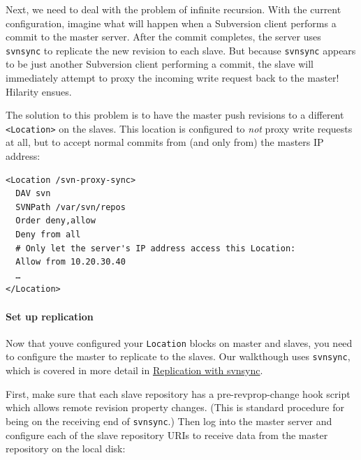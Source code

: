 Next, we need to deal with the problem of infinite recursion. With the
current configuration, imagine what will happen when a Subversion client
performs a commit to the master server. After the commit completes, the
server uses \texttt{svnsync} to replicate the new revision to each
slave. But because \texttt{svnsync} appears to be just another
Subversion client performing a commit, the slave will immediately
attempt to proxy the incoming write request back to the master! Hilarity
ensues.

The solution to this problem is to have the master push revisions to a
different \texttt{\textless{}Location\textgreater{}} on the slaves. This
location is configured to \emph{not} proxy write requests at all, but to
accept normal commits from (and only from) the master\textquotesingle s
IP address:

\begin{verbatim}
<Location /svn-proxy-sync>
  DAV svn
  SVNPath /var/svn/repos
  Order deny,allow
  Deny from all
  # Only let the server's IP address access this Location:
  Allow from 10.20.30.40
  …
</Location>
\end{verbatim}

\paragraph{Set up
replication}\label{svn.serverconfig.httpd.extra.writethruproxy.replicate}

Now that you\textquotesingle ve configured your \texttt{Location} blocks
on master and slaves, you need to configure the master to replicate to
the slaves. Our walkthough uses \texttt{svnsync}, which is covered in
more detail in
\hyperref[svn.reposadmin.maint.replication.svnsync]{Replication with
svnsync}.

First, make sure that each slave repository has a pre-revprop-change
hook script which allows remote revision property changes. (This is
standard procedure for being on the receiving end of \texttt{svnsync}.)
Then log into the master server and configure each of the slave
repository URIs to receive data from the master repository on the local
disk:

